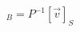 \documentclass[preview]{standalone}
\begin{document}
\begin{align*}
[\vec{v}]_B = P^{-1} [\vec{v}]_S
\end{align*}
\end{document}
